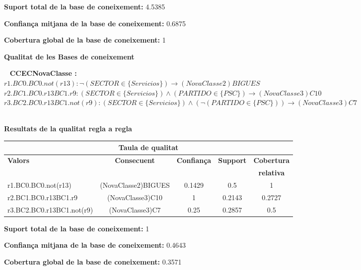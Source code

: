 {\bf Suport total de la base de coneixement:} 4.5385

{\bf Confian\c ca mitjana de la base de coneixement:} 0.6875

{\bf Cobertura global de la base de coneixement:} 1
\newpage
\mbox{ } \vfill
\begin{center} \Large \bf Qualitat de les Bases de coneixement \end{center} \vfill

\newpage
\mbox{ }
{\Large \bf CCECNovaClasse :}\\

$r1.BC0.BC0.not(r13): \neg (SECTOR \in  \{ Servicios \} )\longrightarrow (NovaClasse2)BIGUES$\\

$r2.BC1.BC0.r13BC1.r9: (SECTOR \in  \{ Servicios \} ) \wedge (PARTIDO \in  \{ PSC \} )\longrightarrow (NovaClasse3)C10$\\

$r3.BC2.BC0.r13BC1.not(r9): (SECTOR \in  \{ Servicios \} ) \wedge (\neg (PARTIDO \in  \{ PSC \} ))\longrightarrow (NovaClasse3)C7$\\

\newpage
\vspace{3ex}
\mbox{ }
\begin{center} \Large \bf Resultats de la qualitat regla a regla \end{center}

\begin{center}
\begin{tabular}{|p{3cm}|c|c|c|c|}
\hline
\multicolumn{5}{|c|}{\bf Taula de qualitat} \\ 
\hline
{\bf Valors} & {\bf Consecuent} & {\bf Confian\c ca} & {\bf Support} & {\bf Cobertura} \\ 
 & {\bf } & {\bf } & {\bf } & {\bf relativa} \\ 
\hline
\hline
r1.BC0.BC0.not(r13) & (NovaClasse2)BIGUES & 0.1429 & 0.5 & 1 \\ 
\hline
r2.BC1.BC0.r13BC1.r9 & (NovaClasse3)C10 & 1 & 0.2143 & 0.2727 \\ 
\hline
r3.BC2.BC0.r13BC1.not(r9) & (NovaClasse3)C7 & 0.25 & 0.2857 & 0.5 \\ 
\hline
\hline
\end{tabular}
\end{center} \vfill


{\bf Suport total de la base de coneixement:} 1

{\bf Confian\c ca mitjana de la base de coneixement:} 0.4643

{\bf Cobertura global de la base de coneixement:} 0.3571

